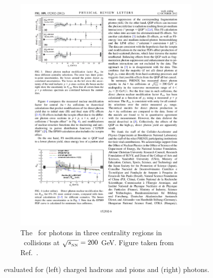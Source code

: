 \begin{figure}
\begin{subfigure}{.49\textwidth}
\includegraphics[width=\textwidth]{figures/jetMeasurements/photon_raa}
\caption{The \RAA\ for photons in three centrality regions in \AuAu\ collisions at $\mbox{$\sqrt{s_{_\text{NN}}}$} = 200$ GeV.
Figure taken from Ref.~\cite{PhysRevLett.109.152302}.}
\label{fig:photon_raa}
\end{subfigure}
\caption{\RAA\ evaluated for (left) charged hadrons and pions and (right) photons.}
\label{fig:particle_raa}
\end{figure}



